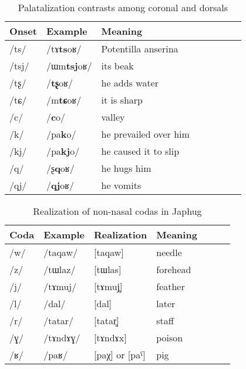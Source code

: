 \documentclass[oldfontcommands,oneside,a4paper,11pt]{article}
\newcommand{\ipa}[1]{\mbox{/#1/}} %
\begin{document}
      		   \begin{table}[H]
 \caption{Palatalization contrasts among coronal and dorsals } \label{tab:coronal.dorsal}  \centering
\begin{tabular}{llllllll}
\toprule		
Onset & Example & Meaning \\
\midrule
      \ipa{ts} &      \ipa{tɤ\textbf{ts}oʁ}  & Potentilla anserina \\
      \ipa{tsj} &     \ipa{ɯm\textbf{tsj}oʁ}  & its beak \\
      \ipa{tʂ} &      \ipa{\textbf{tʂ}oʁ}  & he adds water \\
      \ipa{tɕ} &      \ipa{m\textbf{tɕ}oʁ}  &it is sharp\\
      \ipa{c} &      \ipa{\textbf{c}o}  & valley \\
      \ipa{k} &      \ipa{pa\textbf{k}o}  & he prevailed over him \\
      \ipa{kj} &      \ipa{pa\textbf{kj}o}  & he caused it to slip \\
      \ipa{q} &      \ipa{ʂ\textbf{q}oʁ}  &he hugs him \\
      \ipa{qj} &      \ipa{\textbf{qj}oʁ}  & he vomits \\
      \bottomrule
\end{tabular}
\end{table}
 
\begin{table}
 \caption{Realization of non-nasal  codas in Japhug} \label{tab:codas}  \centering
\begin{tabular}{lllllll}
\toprule
Coda & Example & Realization &Meaning\\
\midrule
\ipa{w} & \ipa{taqaw} &[taqaw] &needle\\
\ipa{z} & \ipa{tɯlaz} &[tɯlas] &forehead\\
\ipa{j} & \ipa{tɤmuj} &[tɤmuj̥] &feather\\
\ipa{l} & \ipa{dal} &[dal] &later\\
\ipa{r} & \ipa{tatar} &[tatar̥] &staff\\
\ipa{ɣ} & \ipa{tɤndɤɣ} &[tɤndɤx] &poison\\
\ipa{ʁ} & \ipa{paʁ} & [paχ] or [paˁ] &pig\\
\bottomrule
\end{tabular}
\end{table}
    
\end{document}
